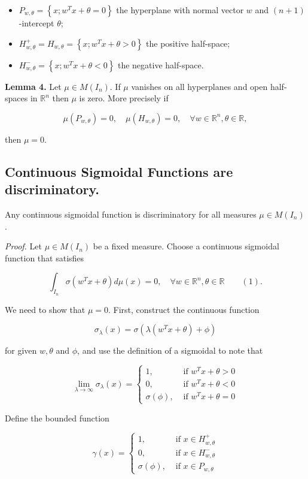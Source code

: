 \begin{itemize}
  \item $P_{w,\theta}=\left\{x;w^Tx+\theta=0\right\}$ the hyperplane with normal vector $w$ and $(n+1)$-intercept $\theta$;
  \item $H^+_{w,\theta}=H_{w,\theta}=\left\{x;w^Tx+\theta>0\right\}$ the positive half-space;
  \item $H^-_{w,\theta}=\left\{x;w^Tx+\theta < 0\right\}$ the negative half-space.
\end{itemize}

\textbf{Lemma 4.} Let $\mu \in M(I_n)$. If $\mu$ vanishes on all hyperplanes and open half-spaces in $\mathbb{R}^n$ then $\mu$ is zero. More precisely if

$$
\mu(P_{w,\theta})=0, \quad \mu(H_{w,\theta})=0, \quad \forall w\in\mathbb{R}^n, \theta\in\mathbb{R},
$$

then $\mu=0$.\\

\subsection{Continuous Sigmoidal Functions are discriminatory.} Any continuous sigmoidal function is discriminatory for all measures $\mu \in M(I_n)$.

\textit{Proof.} Let $\mu\in M(I_n)$ be a fixed measure. Choose a continuous sigmoidal function that satisfies

$$
\int_{I_n}\sigma(w^Tx+\theta)d\mu(x)=0, \quad \forall w\in\mathbb{R}^n, \theta\in\mathbb{R} \qquad (1).
$$

We need to show that $\mu=0$. First, construct the continuous function

$$
\sigma_{\lambda}(x)=\sigma\left(\lambda\left(w^T x+\theta\right)+\phi\right)
$$

for given $w, \theta$ and $\phi$, and use the definition of a sigmoidal to note that

$$
\lim_{\lambda \rightarrow \infty} \sigma_\lambda(x)=\left\{\begin{array}{ll}
1, & \text { if } w^T x+\theta>0 \\
0, & \text { if } w^T x+\theta<0 \\
\sigma(\phi), & \text { if } w^T x+\theta=0
\end{array} \right.
$$

Define the bounded function

$$
\gamma(x)=\left\{\begin{array}{ll}
1, & \text { if } x \in H_{w, \theta}^{+} \\
0, & \text { if } x \in H_{w, \theta}^{-} \\
\sigma(\phi), & \text { if } x \in P_{w, \theta}
\end{array}\right.
$$

